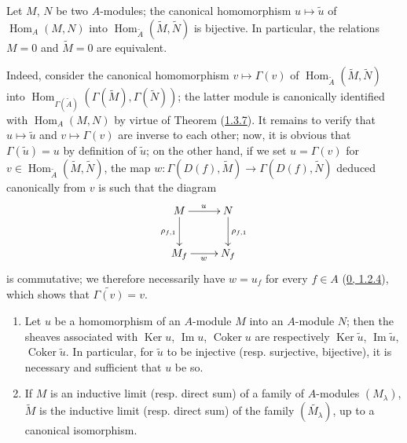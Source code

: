 \begin{corollary}[1.3.8]
\label{I.1.3.8}
Let $M$, $N$ be two $A$-modules; the canonical homomorphism
$u\mapsto\widetilde{u}$ of $\operatorname{Hom}_A(M,N)$ into
$\operatorname{Hom}_{\widetilde{A}}(\widetilde{M},\widetilde{N})$ is
bijective. In particular, the relations $M=0$ and $\widetilde{M}=0$ are
equivalent.
\end{corollary}

Indeed, consider the canonical homomorphism $v\mapsto\Gamma(v)$ of
$\operatorname{Hom}_{\widetilde{A}}(\widetilde{M},\widetilde{N})$ into
$\operatorname{Hom}_{\Gamma(\widetilde{A})}
(\Gamma(\widetilde{M}),\Gamma(\widetilde{N}))$; the latter module is
canonically identified with $\operatorname{Hom}_A(M,N)$ by virtue of Theorem
(\hyperref[I.1.3.7]{1.3.7}). It remains to verify that
$u\mapsto\widetilde{u}$ and $v\mapsto\Gamma(v)$ are inverse to each
other; now, it is obvious that $\Gamma(\widetilde{u})=u$ by definition of
$\widetilde{u}$; on the other hand, if we set $u=\Gamma(v)$ for
$v\in\operatorname{Hom}_{\widetilde{A}}(\widetilde{M},\widetilde{N})$,
the map
$w:\Gamma(D(f),\widetilde{M})\to\Gamma(D(f),\widetilde{N})$ deduced
canonically from $v$ is such that the diagram
\[
  \xymatrix{
    M\ar[r]^u\ar[d]_{\rho_{f,1}} & N\ar[d]^{\rho_{f,1}}\\
    M_f\ar[r]_w & N_f
  }
\]
is commutative; we therefore necessarily have $w=u_f$ for every $f\in A$
(\hyperref[0.1.2.4]{0, 1.2.4}), which shows that
$\widetilde{\Gamma(v)}=v$.

\begin{corollary}[1.3.9]
\label{I.1.3.9}
\begin{enumerate}
  \item[\rm(i)] Let $u$ be a homomorphism of an $A$-module $M$ into an
  $A$-module $N$; then the sheaves associated with $\operatorname{Ker}u$,
  $\operatorname{Im}u$, $\operatorname{Coker}u$ are respectively
  $\operatorname{Ker}\widetilde{u}$, $\operatorname{Im}\widetilde{u}$,
  $\operatorname{Coker}\widetilde{u}$. In particular, for
  $\widetilde{u}$ to be injective (resp. surjective, bijective), it is
  necessary and sufficient that $u$ be so.
  \item[\rm(ii)] If $M$ is an inductive limit (resp. direct sum) of a
  family of $A$-modules $(M_\lambda)$, $\widetilde{M}$ is the inductive limit
  (resp. direct sum) of the family $(\widetilde{M_\lambda})$, up to a
  canonical isomorphism.
\end{enumerate}
\end{corollary}

